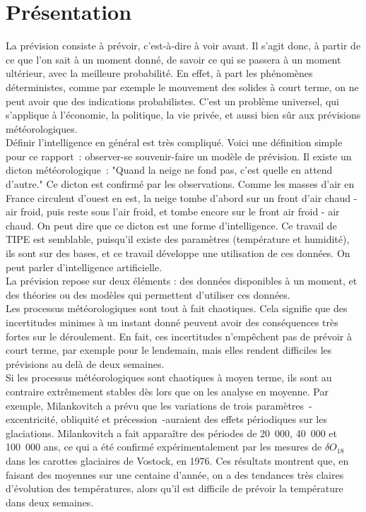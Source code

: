 \documentclass[11pt,a4paper]{article}
\begin{document}
\section{Présentation} 
La prévision consiste à prévoir, c'est-à-dire à \og voir avant\fg{}. Il s'agit donc, à partir de ce que l'on sait à un moment donné, de savoir ce qui se passera à un moment ultérieur, avec la meilleure probabilité. En effet, à part les phénomènes déterministes, comme par exemple le mouvement des solides à court terme, on ne peut avoir que des indications probabilistes. C'est un problème universel, qui s'applique à l'économie, la politique, la vie privée, et aussi bien sûr aux prévisions météorologiques.\\   
Définir l'intelligence en général est très compliqué. Voici une définition simple pour ce rapport~: observer-se souvenir-faire un modèle de prévision. Il existe un dicton météorologique~: "Quand la neige ne fond pas, c'est quelle en attend d'autre." Ce dicton est confirmé par les observations. Comme les masses d'air en France circulent d'ouest en est, la neige tombe d'abord sur un front d'air chaud -air froid, puis reste sous l'air froid, et tombe encore sur le front air froid - air chaud. On peut dire que ce dicton est une forme d'intelligence. Ce travail de TIPE est semblable, puisqu'il existe des paramètres (température et humidité), ils sont sur des bases, et ce travail développe une utilisation de ces données.  On peut parler d'intelligence artificielle. \\
La prévision repose sur deux éléments : des données disponibles à un moment, et des théories ou des modèles qui permettent d'utiliser ces données. \\
Les processus météorologiques sont tout à fait chaotiques. Cela signifie que des incertitudes minimes à un instant donné peuvent avoir des conséquences très fortes sur le déroulement. En fait, ces incertitudes n'empêchent pas de prévoir à court terme, par exemple pour le lendemain, mais elles rendent difficiles les prévisions au delà de deux semaines. \\
Si les processus météorologiques sont chaotiques à moyen terme, ils sont au contraire extrêmement stables dès lors que on les analyse en moyenne. Par exemple, Milankovitch a prévu que les variations de trois paramètres~-excentricité, obliquité et précession~-auraient des effets périodiques sur les glaciations. Milankovitch a fait apparaître des périodes de 20~000, 40~000 et 100~000 ans, ce qui a été confirmé expérimentalement par les mesures de $\delta O_{18}$ dans les carottes glaciaires de Vostock, en 1976. Ces résultats montrent que, en faisant des moyennes sur une centaine d'année, on a des tendances très claires d'évolution des températures, alors qu'il est difficile de prévoir la température dans deux semaines.   
 
\end{document}
